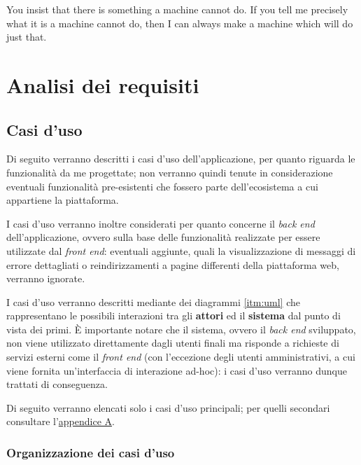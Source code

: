 


    \begin{savequote}[75mm]
        You insist that there is something a machine cannot do. If you tell me precisely what it is a machine cannot do, then I can always make a machine which will do just that.
\end{savequote}
\chapter{Analisi dei requisiti}
\label{chap3}
\section{Casi d'uso}
\label{sec:usecase}
Di seguito verranno descritti i casi d'uso dell'applicazione, per quanto riguarda le funzionalità da me progettate; non verranno quindi tenute in considerazione eventuali funzionalità pre-esistenti che fossero parte dell'ecosistema a cui appartiene la piattaforma.

I casi d'uso verranno inoltre considerati per quanto concerne il \textit{back end} dell'applicazione, ovvero sulla base delle funzionalità realizzate per essere utilizzate dal \textit{front end}: eventuali aggiunte, quali la visualizzazione di messaggi di errore dettagliati o reindirizzamenti a pagine differenti della piattaforma web, verranno ignorate.

I casi d'uso verranno descritti mediante dei diagrammi \ref{itm:uml} che rappresentano le possibili interazioni tra gli \textbf{attori} ed il \textbf{sistema} dal punto di vista dei primi. È importante notare che il sistema, ovvero il \textit{back end} sviluppato, non viene utilizzato direttamente dagli utenti finali ma risponde a richieste di servizi esterni come il \textit{front end} (con l'eccezione degli utenti amministrativi, a cui viene fornita un'interfaccia di interazione ad-hoc): i casi d'uso verranno dunque trattati di conseguenza.

Di seguito verranno elencati solo i casi d'uso principali; per quelli secondari consultare l'\hyperref[sec:AppendixA]{appendice A}.
\subsection{Organizzazione dei casi d'uso}
